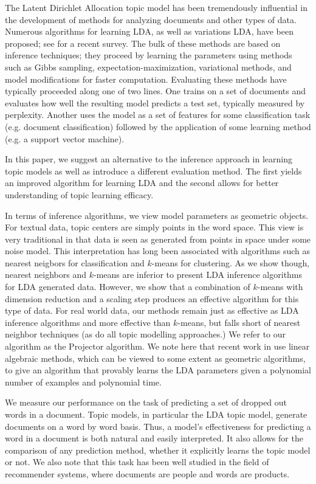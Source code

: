 
The Latent Dirichlet Allocation topic model has been tremendously
influential in the development of methods for analyzing documents and
other types of data.  Numerous algorithms for learning LDA, as
well as variations LDA, have been proposed; see \cite{BleiCACM} for
a recent survey.  The bulk of these methods
are based on inference techniques; they proceed by
learning the parameters using methods such as Gibbs sampling,
expectation-maximization, variational methods, and model modifications for faster
computation.  Evaluating these methods have typically proceeded
along one of two lines. One trains on a set of documents and evaluates
how well the resulting model predicts a test set, typically measured by
perplexity.  Another uses the model as a set of features for some
classification task (e.g. document classification) followed by the application of
some learning method (e.g. a support vector machine).

In this paper, we suggest an alternative to the inference approach in
learning topic models as well as introduce a different evaluation method. The
first yields an improved algorithm for learning LDA and the second
allows for better understanding of topic learning efficacy.

In terms of inference algorithms, we view model parameters as geometric objects.
For textual data, topic centers are simply points in the word space. This view
is very traditional in that data is seen as generated from points in space under
some noise model. This interpretation has long been associated with algorithms
such as nearest neigbors for classification and $k$-means for clustering. As we show
though, nearest neighbors and $k$-means are inferior to
present LDA inference algorithms for LDA generated data.  However, we show that
a combination of $k$-means with dimension reduction and a
scaling step produces an effective algorithm for this type of data.
For real world data, our methods remain just as effective as LDA inference algorithms
and more effective than $k$-means, but falls short of nearest neighbor
techniques (as do all topic modelling approaches.) We refer to
our algorithm as the Projector algorithm.  We note here that recent
work in \cite{AnandLDA} use linear algebraic methods, which can be
viewed to some extent as geometric algorithms, to give an algorithm
that provably learns the LDA parameters given a polynomial
number of examples and polynomial time.

We measure our performance on the task of predicting a set of dropped out
words in a document.  Topic models, in particular the LDA topic model,
generate documents on a word by word basis.  Thus, a model's effectiveness
for predicting a word in a document is both natural and easily interpreted. It also
allows for the comparison of any prediction method, whether it explicitly learns
the topic model or not.  We also note that this task has been well studied
in the field of recommender systems, where documents are people and words are products.



